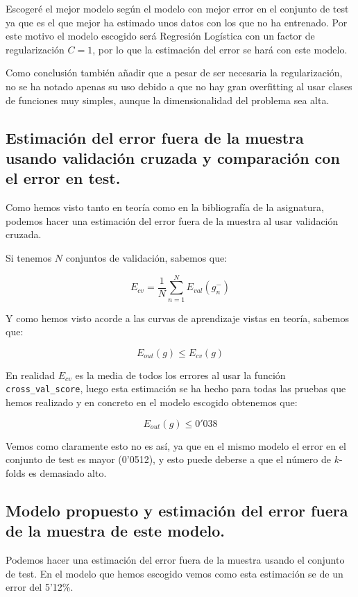 \documentclass[12pt, spanish]{article}
\begin{document}
Escogeré el mejor modelo según el modelo con mejor error en el conjunto de test ya que es el que mejor ha estimado unos datos con los que no ha entrenado. Por este motivo el modelo escogido será Regresión Logística con un factor de regularización $C=1$, por lo que la estimación del error se hará con este modelo.

Como conclusión también añadir que a pesar de ser necesaria la regularización, no se ha notado apenas su uso debido a que no hay gran overfitting al usar clases de funciones muy simples, aunque la dimensionalidad del problema sea alta. 

\newpage

\subsection{Estimación del error fuera de la muestra usando validación cruzada y comparación con el error en test.}

Como hemos visto tanto en teoría\cite{teoria} como en la bibliografía de la asignatura\cite{libro}, podemos hacer una estimación del error fuera de la muestra al usar validación cruzada.

Si tenemos $N$ conjuntos de validación, sabemos que:

$$E_{cv} = \frac{1}{N}\sum_{n=1}^{N}{E_{val}(g_n^-)}$$

Y como hemos visto acorde a las curvas de aprendizaje vistas en teoría, sabemos que:

$$E_{out}(g) \leq E_{cv}(g) $$

En realidad $E_{cv}$ es la media de todos los errores al usar la función \texttt{cross\_val\_score}, luego esta estimación se ha hecho para todas las pruebas que hemos realizado y en concreto en el modelo escogido obtenemos que:

$$  E_{out}(g) \leq 0'038$$

Vemos como claramente esto no es así, ya que en el mismo modelo el error en el conjunto de test es mayor (0'0512), y esto puede deberse a que el número de $k$-folds es demasiado alto.




\subsection{Modelo propuesto y estimación del error fuera de la muestra de este modelo.}

Podemos hacer una estimación del error fuera de la muestra usando el conjunto de test. En el modelo que hemos escogido vemos como esta estimación se de un error del 5'12\%.
\end{document}
